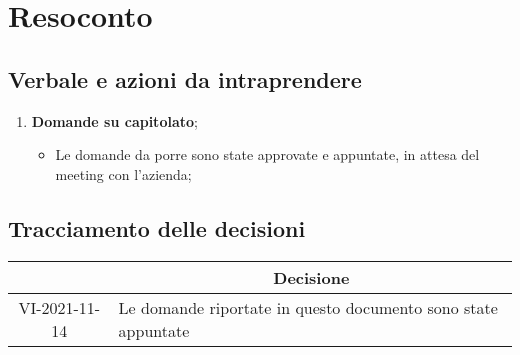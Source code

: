 \section{Resoconto}
\subsection{Verbale e azioni da intraprendere}

\begin{enumerate}
	\item \textbf{Domande su capitolato};
	\begin{itemize}
		\item Le domande da porre sono state approvate e appuntate, in attesa del meeting con l'azienda;
	\end{itemize}
\end{enumerate}

\pagebreak

\subsection{Tracciamento delle decisioni}

\begin{table}[H]
	\centering
	\renewcommand{\arraystretch}{1.8}
	\begin{tabular}{c | p{8cm}}
		\rowcolor[HTML]{125e28}
		\multicolumn{1}{c}{\color[HTML]{FFFFFF} \textbf{ID}} &
		\multicolumn{1}{c}{\color[HTML]{FFFFFF} \textbf{Decisione}}\\
		\hline
		VI-2021-11-14 & Le domande riportate in questo documento sono state appuntate  \\ 
	\end{tabular}
\end{table}